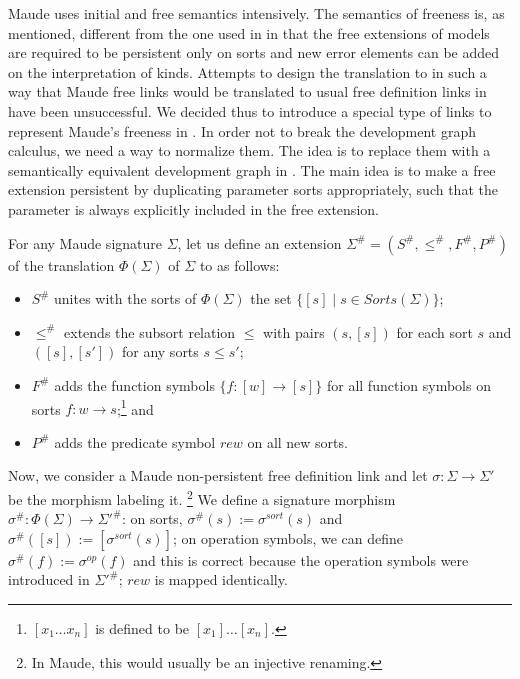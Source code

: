 Maude uses initial and free semantics intensively. The semantics of
freeness is, as mentioned, different from the one used in \CASL in
that the free extensions of models are required to be persistent
only on sorts and new error elements can be added on the
interpretation of kinds. Attempts to design the translation to \CASL
in such a way that Maude free links would be translated to usual free
definition links in \CASL have been unsuccessful. We decided thus to
introduce a special type of links to represent Maude's freeness in
\CASL.  In order not to break the development graph calculus, we need
a way to normalize them. The idea is to replace them with a
semantically equivalent development graph in \CASL. The main idea is
to make a free extension persistent by duplicating parameter sorts
appropriately, such that the parameter is always explicitly included
in the free extension.

For any Maude signature $\Sigma$, let us define
an extension $\Sigma^\# = (S^\#, \leq^\#, F^\#, P^\#)$ of the
translation $\Phi(\Sigma)$ of $\Sigma$ to \CASL as follows:

\begin{itemize}

 \item $S^\#$ unites with the sorts of $\Phi(\Sigma)$ the set 
       $\{[s] \mid s \in Sorts(\Sigma)\}$;

 \item $\leq^\#$ extends the subsort relation $\leq$ with pairs
       $(s, [s])$ for each sort $s$ and $([s],[s'])$ for any sorts $s \leq s'$;

 \item $F^\#$ adds the function symbols $\{f:[w] \rightarrow [s]\}$ for all
       function symbols on sorts $f:w \rightarrow s $;\footnote{$[x_1 \ldots x_n]$
       is defined to be $[x_1] \ldots [x_n]$.} and
 \item $P^\#$ adds the predicate symbol $rew$ on all new sorts.
\end{itemize}

Now, we consider a Maude non-persistent free definition link and let
$\sigma: \Sigma \rightarrow \Sigma'$ be the morphism labeling it.%
\footnote{In Maude, this would usually be an injective renaming.}
We define a \CASL signature morphism 
 $\sigma^\# : \Phi(\Sigma) \rightarrow \Sigma'^\#$: on sorts, 
 $\sigma^\#(s) := \sigma^{sort}(s)$ and $\sigma^\#([s]):=[\sigma^{sort}(s)]$;
 on operation symbols, we can define $\sigma^ \#(f) := 
 \sigma^{op}(f)$ and this is correct because the operation symbols were
 introduced in $\Sigma'^\#$; $rew$ is mapped identically.


